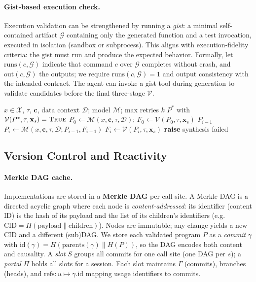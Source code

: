 \paragraph{Gist-based execution check.}
Execution validation can be strengthened by running a \emph{gist}: a minimal
self-contained artifact $\mathcal{G}$ containing only the generated function
and a test invocation, executed in isolation (sandbox or subprocess).  This
aligns with execution-fidelity criteria: the gist must run and produce the
expected behavior.  Formally, let $\mathrm{runs}(c, \mathcal{G})$ indicate
that command $c$ over $\mathcal{G}$ completes without crash, and
$\mathrm{out}(c, \mathcal{G})$ the outputs; we require
$\mathrm{runs}(c, \mathcal{G}) = 1$ and output consistency with the
intended contract.  The agent can invoke a gist tool during generation to
validate candidates before the final three-stage $\mathcal{V}$.

\begin{algorithm}[t]
\caption{\textsc{Synthesize} (core loop)}
\label{alg:abbrev-synthesize}
\begin{algorithmic}[1]
\Require $x \in \mathcal{X}$, $\tau$, $\mathbf{c}$, data context $\mathcal{D}$; model $\mathcal{M}$; max retries $k$
\Ensure $P^*$ with $\mathcal{V}(P^*, \tau, \mathbf{x}_s) = \textsc{True}$
\State $P_0 \gets \mathcal{M}(x, \mathbf{c}, \tau, \mathcal{D})$; $F_0 \gets \mathcal{V}(P_0, \tau, \mathbf{x}_s)$
    \State \Return $P_{i-1}$
  \EndIf
  \State $P_i \gets \mathcal{M}(x, \mathbf{c}, \tau, \mathcal{D}; P_{i-1}, F_{i-1})$
  \State $F_i \gets \mathcal{V}(P_i, \tau, \mathbf{x}_s)$
\EndFor
\State \textbf{raise} synthesis failed
\end{algorithmic}
\end{algorithm}



\subsection{Version Control and Reactivity}
\label{sec:abbrev-vc-reactivity}

\paragraph{Merkle DAG cache.}
Implementations are stored in a \textbf{Merkle DAG} per call site.  A
Merkle DAG is a directed acyclic graph where each node is
\emph{content-addressed}: its identifier (content ID) is the hash of its
payload and the list of its children's identifiers (e.g.\
$\mathrm{CID} = H(\mathrm{payload} \| \mathrm{children})$).  Nodes are
immutable; any change yields a new CID and a different (sub)DAG.  We store
each validated program $P$ as a \emph{commit} $\gamma$ with
$\mathrm{id}(\gamma) = H(\mathrm{parents}(\gamma) \| H(P))$, so the DAG
encodes both content and causality.  A \emph{slot} $S$ groups all commits for
one call site (one DAG per $s$); a \emph{portal} $\Pi$ holds all slots for a
session.  Each slot maintains $\Gamma$ (commits), branches (heads), and
$\mathrm{refs}: u \mapsto \gamma.\mathrm{id}$ mapping usage identifiers to
commits.

